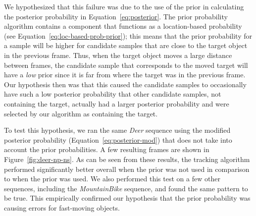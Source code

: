 \documentclass{sig-alternate-05-2015}
\begin{document}
We hypothesized that this failure was due to the use of the prior in calculating the posterior probability in Equation~\ref{eq:posterior}.
The prior probability algorithm contains a component that functions as a location-based probability (see Equation~\ref{eq:loc-based-prob-prior}); this means that the prior probability for a sample will be higher for candidate samples that are close to the target object in the previous frame.
Thus, when the target object moves a large distance between frames, the candidate sample that corresponds to the moved target will have a \textit{low} prior since it is far from where the target was in the previous frame.
Our hypothesis then was that this caused the candidate samples to occasionally have such a low posterior probability that other candidate samples, not containing the target, actually had a larger posterior probability and were selected by our algorithm as containing the target.

To test this hypothesis, we ran the same \textit{Deer} sequence using the modified posterior probability (Equation~\ref{eq:posterior-mod}) that does not take into account the prior probabilities.
A few resulting frames are shown in Figure~\ref{fig:deer-np-ns}.
As can be seen from these results, the tracking algorithm performed significantly better overall when the prior was not used in comparison to when the prior was used.
We also performed this test on a few other sequences, including the \textit{MountainBike} sequence, and found the same pattern to be true.
This empirically confirmed our hypothesis that the prior probability was causing errors for fast-moving objects.
\end{document}

